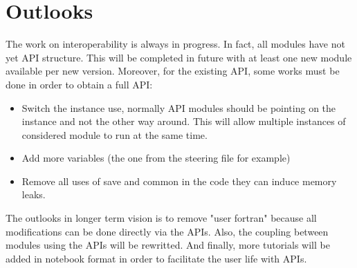 \chapter{Outlooks}
\label{ch:oulooks}

The work on \telemacsystem interoperability is always in progress. In fact, all modules have not yet API structure.
This will be completed in future with at least one new module available per new \telemacsystem version. Moreover, for the
existing API, some works must be done in order to obtain a full API:
\begin{itemize}
\item Switch the instance use, normally API modules should be pointing on the
instance and not the other way around. This will allow multiple instances of
considered module to run at the same time.
\item Add more variables (the one from the steering file for example)
\item Remove all uses of save and common in the code they can induce memory
leaks.
\end{itemize}
The outlooks in longer term vision is to remove "user fortran" because all modifications can be done directly via the APIs. Also, the coupling between modules using the APIs will be rewritted. And finally, more tutorials will be added in notebook format in order to facilitate the user life with APIs.
